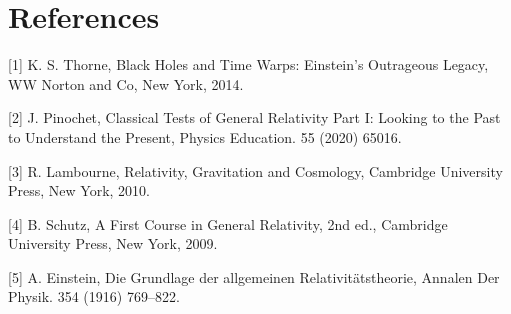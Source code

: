 \documentclass[11pt,letterpaper]{article}
\begin{document}
\section*{References}

[1] K. S. Thorne, Black Holes and Time Warps: Einstein’s Outrageous Legacy, WW Norton and Co, New York, 2014.

\vspace{2mm}

[2]	J. Pinochet, Classical Tests of General Relativity Part I: Looking to the Past to Understand the Present, Physics Education. 55 (2020) 65016.

\vspace{2mm}

[3]	R. Lambourne, Relativity, Gravitation and Cosmology, Cambridge University Press, New York, 2010.

\vspace{2mm}

[4]	B. Schutz, A First Course in General Relativity, 2nd ed., Cambridge University Press, New York, 2009.

\vspace{2mm}

[5]	A. Einstein, Die Grundlage der allgemeinen Relativitätstheorie, Annalen Der Physik. 354 (1916) 769–822.

\vspace{2mm}
\end{document}
